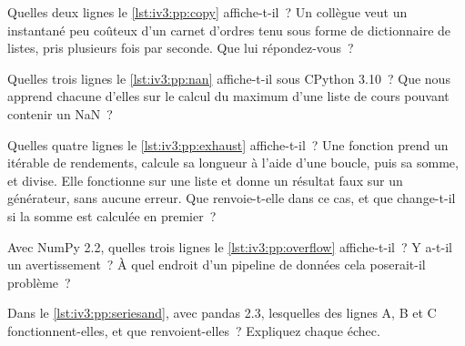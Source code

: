 \begin{question}\label{iq:iv3:python-and-pandas:5}
Quelles deux lignes le \cref{lst:iv3:pp:copy} affiche-t-il~? Un collègue veut un instantané peu coûteux d'un carnet d'ordres tenu sous forme de dictionnaire de listes, pris plusieurs fois par seconde. Que lui répondez-vous~?
\label{lst:iv3:pp:copy}
\end{question}

\begin{question}\label{iq:iv3:python-and-pandas:6}
Quelles trois lignes le \cref{lst:iv3:pp:nan} affiche-t-il sous CPython 3.10~? Que nous apprend chacune d'elles sur le calcul du maximum d'une liste de cours pouvant contenir un NaN~?
\label{lst:iv3:pp:nan}
\end{question}

\begin{question}\label{iq:iv3:python-and-pandas:7}
Quelles quatre lignes le \cref{lst:iv3:pp:exhaust} affiche-t-il~? Une fonction prend un itérable de rendements, calcule sa longueur à l'aide d'une boucle, puis sa somme, et divise. Elle fonctionne sur une liste et donne un résultat faux sur un générateur, sans aucune erreur. Que renvoie-t-elle dans ce cas, et que change-t-il si la somme est calculée en premier~?
\label{lst:iv3:pp:exhaust}
\end{question}

\begin{question}\label{iq:iv3:python-and-pandas:8}
Avec NumPy 2.2, quelles trois lignes le \cref{lst:iv3:pp:overflow} affiche-t-il~? Y a-t-il un avertissement~? À quel endroit d'un pipeline de données cela poserait-il problème~?
\label{lst:iv3:pp:overflow}
\end{question}

\begin{question}\label{iq:iv3:python-and-pandas:9}
Dans le \cref{lst:iv3:pp:seriesand}, avec pandas 2.3, lesquelles des lignes A, B et C fonctionnent-elles, et que renvoient-elles~? Expliquez chaque échec.
\label{lst:iv3:pp:seriesand}
\end{question}

